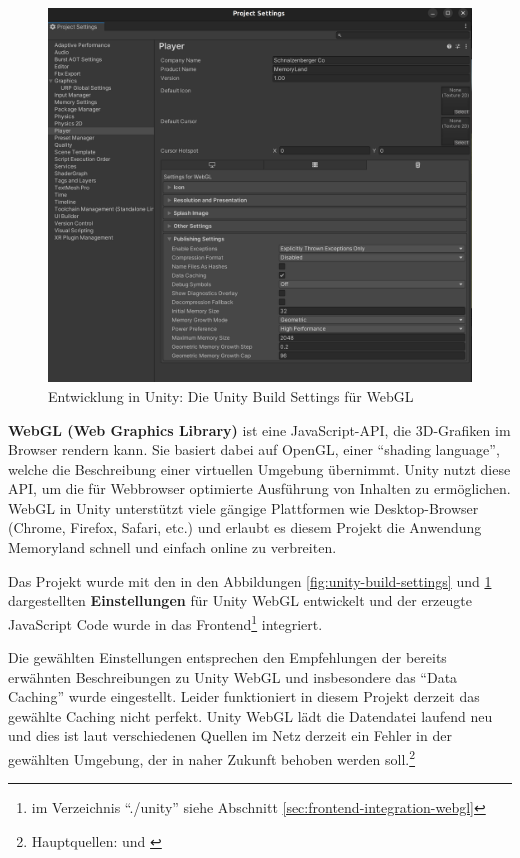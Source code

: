 \begin{figure}
    \centering
    \includegraphics[scale=0.09]{pics/unity-build-webgl-settings.png}
    \caption{Entwicklung in Unity: Die Unity Build Settings für WebGL}
    \label{fig:unity-build-webgl-settings}
\end{figure}



\textbf{WebGL (Web Graphics Library)} ist eine JavaScript-API, die 3D-Grafiken im Browser rendern kann. Sie basiert dabei auf OpenGL, einer ``shading language'', welche die Beschreibung einer virtuellen Umgebung übernimmt. Unity nutzt diese API, um die für Webbrowser optimierte Ausführung von Inhalten zu ermöglichen. WebGL in Unity unterstützt viele gängige Plattformen wie Desktop-Browser (Chrome, Firefox, Safari, etc.) und erlaubt es diesem Projekt die Anwendung Memoryland schnell und einfach online zu verbreiten.


Das Projekt wurde mit den in den Abbildungen \ref{fig:unity-build-settings} und \ref{fig:unity-build-webgl-settings} dargestellten \textbf{Einstellungen} für Unity WebGL entwickelt und der erzeugte JavaScript Code wurde in das Frontend\footnote{im Verzeichnis ``./unity'' siehe Abschnitt \ref{sec:frontend-integration-webgl}} integriert.


Die gewählten Einstellungen entsprechen den Empfehlungen der bereits erwähnten Beschreibungen zu Unity WebGL und insbesondere das ``Data Caching'' wurde eingestellt. Leider funktioniert in diesem Projekt derzeit das gewählte Caching nicht perfekt. Unity WebGL lädt die Datendatei laufend neu und dies ist laut verschiedenen Quellen im Netz derzeit ein Fehler in der gewählten Umgebung, der in naher Zukunft behoben werden soll.\footnote{Hauptquellen: \cite{UnityDocsDataCachingIssue} und \cite{UnityDocsDataCachingIssue2}}


